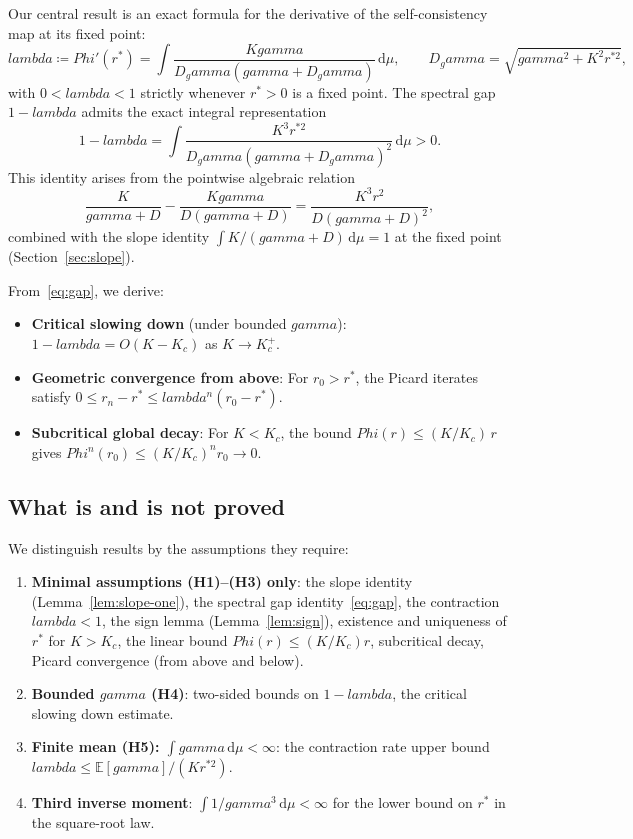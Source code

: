 \documentclass[11pt,a4paper]{article}
\let\Phi\relax\def\Phi{Phi}%
\let\lambda\relax\def\lambda{lambda}%
\let\gamma\relax\def\gamma{gamma}%
\theoremstyle{definition}
\begin{document}
Our central result is an exact formula for the derivative of the self-consistency map at its fixed point:
\begin{equation}\label{eq:lambda}
\lambda \coloneqq \Phi'(r^*) = \int \frac{K\gamma}{D_\gamma(\gamma + D_\gamma)}\,\mathrm{d}\mu, \qquad D_\gamma = \sqrt{\gamma^2 + K^2 r^{*2}},
\end{equation}
with $0 < \lambda < 1$ strictly whenever $r^* > 0$ is a fixed point. The spectral gap $1 - \lambda$ admits the exact integral representation
\begin{equation}\label{eq:gap}
1 - \lambda = \int \frac{K^3 r^{*2}}{D_\gamma(\gamma + D_\gamma)^2}\,\mathrm{d}\mu > 0.
\end{equation}
This identity arises from the pointwise algebraic relation
\[
\frac{K}{\gamma + D} - \frac{K\gamma}{D(\gamma + D)} = \frac{K^3 r^2}{D(\gamma + D)^2},
\]
combined with the slope identity $\int K/(\gamma + D)\,\mathrm{d}\mu = 1$ at the fixed point (Section~\ref{sec:slope}).

From~\eqref{eq:gap}, we derive:
\begin{itemize}[nosep]
\item \textbf{Critical slowing down} (under bounded $\gamma$): $1 - \lambda = O(K - K_c)$ as $K \to K_c^+$.
\item \textbf{Geometric convergence from above}: For $r_0 > r^*$, the Picard iterates satisfy $0 \leq r_n - r^* \leq \lambda^n (r_0 - r^*)$.
\item \textbf{Subcritical global decay}: For $K < K_c$, the bound $\Phi(r) \leq (K/K_c)\,r$ gives $\Phi^n(r_0) \leq (K/K_c)^n r_0 \to 0$.
\end{itemize}

\subsection{What is and is not proved}

We distinguish results by the assumptions they require:
\begin{enumerate}[nosep]
\item \textbf{Minimal assumptions (H1)--(H3) only}: the slope identity (Lemma~\ref{lem:slope-one}), the spectral gap identity~\eqref{eq:gap}, the contraction $\lambda < 1$, the sign lemma (Lemma~\ref{lem:sign}), existence and uniqueness of $r^*$ for $K > K_c$, the linear bound $\Phi(r) \leq (K/K_c)r$, subcritical decay, Picard convergence (from above and below).
\item \textbf{Bounded $\gamma$ (H4)}: two-sided bounds on $1 - \lambda$, the critical slowing down estimate.
\item \textbf{Finite mean (H5): $\int \gamma\,\mathrm{d}\mu < \infty$}: the contraction rate upper bound $\lambda \leq \mathbb{E}[\gamma]/(Kr^{*2})$.
\item \textbf{Third inverse moment}: $\int 1/\gamma^3\,\mathrm{d}\mu < \infty$ for the lower bound on $r^*$ in the square-root law.
\end{enumerate}
\end{document}
